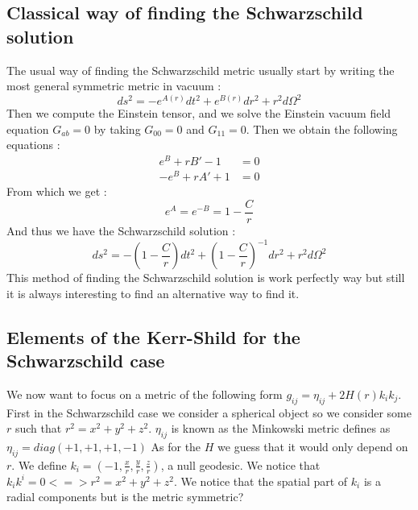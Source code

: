 \documentclass[a4paper,12pt]{article}
\theoremstyle{definition}
\begin{document}
\subsection{Classical way of finding the Schwarzschild solution}
The usual way of finding the Schwarzschild metric usually start by writing the most general symmetric metric in vacuum :
\begin{equation*}
	ds^2=-e^{A(r)}dt^2+e^{B(r)}dr^2+r^2d\Omega^2
\end{equation*}
Then we compute the Einstein tensor, and we solve the Einstein vacuum field equation $G_{ab}=0$ by taking $G_{00}=0$ and $G_{11}=0$. Then we obtain the following equations :
\begin{align*}
	e^B+rB'-1&=0\\
	-e^B+rA'+1&=0
\end{align*}
From which we get :
\begin{equation*}
	e^A=e^{-B}=1-\frac{C}{r}
\end{equation*}
And thus we have the Schwarzschild solution :
\begin{equation*}
	ds^2=-(1-\frac{C}{r})dt^2+(1-\frac{C}{r})^{-1}dr^2+r^2d\Omega^2
\end{equation*}
This method of finding the Schwarzschild solution is work perfectly way but still it is always interesting to find an alternative way to find it.
\subsection{Elements of the Kerr-Shild for the Schwarzschild case}
We now want to focus on a metric of the following form $g_{ij}=\eta_{ij}+2H(r)k_ik_j$.
First in the Schwarzschild case we consider a spherical object so we consider some $r$ such that $r^2=x^2+y^2+z^2$.
$\eta_{ij}$ is known as the Minkowski metric defines as $\eta_{ij}=diag(+1,+1,+1,-1)$
As for the $H$ we guess that it would only depend on $r$.
We define $k_i=(-1,\frac{x}{r},\frac{y}{r},\frac{z}{r})$, a null geodesic.
We notice that $k_ik^i=0 <=> r^2=x^2+y^2+z^2$.
We notice that the spatial part of $k_i$ is a radial components but is the metric symmetric?
\end{document}
